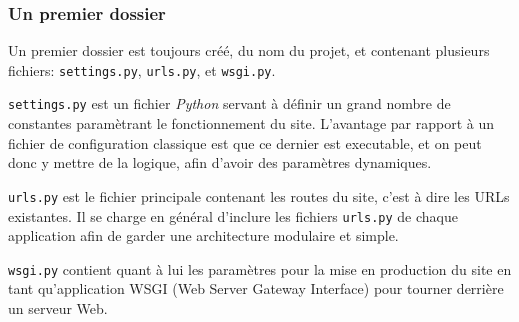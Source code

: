\documentclass[a4paper]{report}
\begin{document}
\subsubsection{Un premier dossier}
\label{ssub:Un premier dossier}
\par Un premier dossier est toujours créé, du nom du projet, et contenant plusieurs fichiers: \verb#settings.py#,
\verb#urls.py#, et \verb#wsgi.py#.

\par \verb#settings.py# est un fichier \emph{Python} servant à définir un grand nombre de constantes paramètrant le
fonctionnement du site. L'avantage par rapport à un fichier de configuration classique est que ce dernier est
executable, et on peut donc y mettre de la logique, afin d'avoir des paramètres dynamiques.

\par \verb#urls.py# est le fichier principale contenant les routes du site, c'est à dire les URLs existantes. Il se
charge en général d'inclure les fichiers \verb#urls.py# de chaque application afin de garder une architecture modulaire
et simple.

\par \verb#wsgi.py# contient quant à lui les paramètres pour la mise en production du site en tant qu'application WSGI
(Web Server Gateway Interface) pour tourner derrière un serveur Web.
\end{document}
